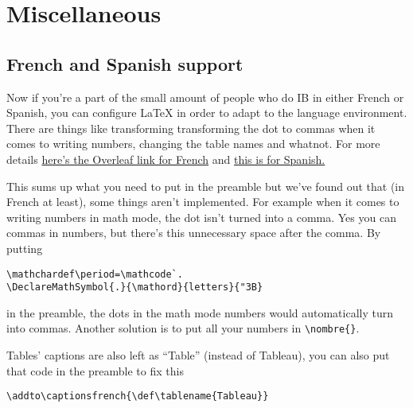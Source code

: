 %
%
%
%
%
\section{Miscellaneous}
\subsection{French and Spanish support}
Now if you're a part of the small amount of people who do IB in either French or Spanish,
you can configure \LaTeX{} in order to adapt to the language environment.
There are things like transforming transforming the dot to commas when it comes to writing numbers,
changing the table names and whatnot. For more details
\href{https://www.overleaf.com/learn/latex/French}{here's the Overleaf link for French}
and \href{https://www.overleaf.com/learn/latex/Spanish}{this is for Spanish.}

This sums up what you need to put in the preamble but we've found out that (in French at least),
some things aren't implemented. For example when it comes to writing numbers in math mode,
the dot isn't turned into a comma. Yes you can commas in numbers, but there's this unnecessary space after the comma.
By putting 
\begin{verbatim}
\mathchardef\period=\mathcode`.
\DeclareMathSymbol{.}{\mathord}{letters}{"3B}
\end{verbatim}
in the preamble, the dots in the math mode numbers would automatically turn into commas.
Another solution is to put all your numbers in \verb|\nombre{}|.

Tables' captions are also left as ``Table'' (instead of Tableau), you can also put that code in the preamble to fix this
\begin{verbatim}
\addto\captionsfrench{\def\tablename{Tableau}}
\end{verbatim}

